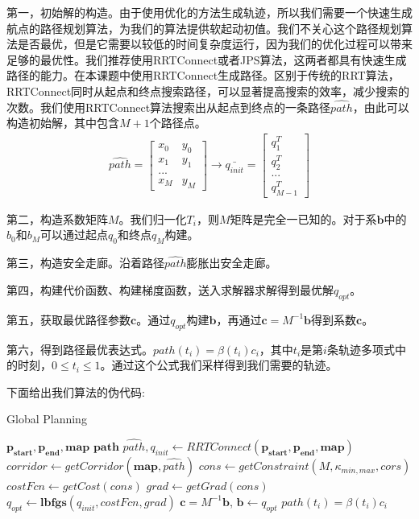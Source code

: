 \documentclass[master,academic]{ysuthesis} %
\begin{document}
		第一，初始解的构造。由于使用优化的方法生成轨迹，所以我们需要一个快速生成航点的路径规划算法，为我们的算法提供软起动初值。我们不关心这个路径规划算法是否最优，但是它需要以较低的时间复杂度运行，因为我们的优化过程可以带来足够的最优性。我们推荐使用RRTConnect或者JPS算法，这两者都具有快速生成路径的能力。在本课题中使用RRTConnect生成路径。区别于传统的RRT算法，RRTConnect同时从起点和终点搜索路径，可以显著提高搜索的效率，减少搜索的次数。我们使用RRTConnect算法搜索出从起点到终点的一条路径$\hat{path}$，由此可以构造初始解，其中包含$M+1$个路径点。
		\begin{equation}
			\begin{aligned}
				\hat{path} = \begin{bmatrix}
					x_0 &y_0\\
					x_1&y_1\\
					...\\
					x_M& y_M
				\end{bmatrix} \longrightarrow \bar{q_{init}}
				=\begin{bmatrix}
					q^T_1\\
					q^T_2\\
					...\\
					q^T_{M-1}
				\end{bmatrix}
			\end{aligned}
		\end{equation}

		第二，构造系数矩阵$M$。我们归一化$T_i$，则$M$矩阵是完全一已知的。对于系$\mathbf{b}$中的$b_0$和$b_M$可以通过起点$q_0$和终点$q_M$构建。
		
		第三，构造安全走廊。沿着路径$\hat{path}$膨胀出安全走廊。

		第四，构建代价函数、构建梯度函数，送入求解器求解得到最优解$q_{opt}$。

		第五，获取最优路径参数$\mathbf{c}$。通过$q_{opt}$构建$\mathbf{b}$，再通过$\mathbf{c} = M^{-1}\mathbf{b}$得到系数$\mathbf{c}$。

		第六，得到路径最优表达式。$path(t_i)=\beta(t_i)c_i$，其中$t_i$是第$i$条轨迹多项式中的时刻，$0 \le t_i \le 1$。通过这个公式我们采样得到我们需要的轨迹。
		
		下面给出我们算法的伪代码:
		 \begin{algorithm}[H]  
		 	\caption{Global Planning}  
		 	\label{alg:global_planning}  
		 	\begin{algorithmic}[1]  
		 		\REQUIRE  
		 		$\mathbf{p_{start}},\mathbf{p_{end}},\mathbf{map}$
		 		\ENSURE  
		 		$\mathbf{path}$
		 		\STATE $\hat{path},q_{init} \leftarrow RRTConnect(\mathbf{p_{start}},\mathbf{p_{end}},\mathbf{map})$
		 		\STATE $corridor \leftarrow getCorridor(\mathbf{map},\hat{path})$
		 		\STATE $cons \leftarrow getConstraint(M,\kappa_{min,max},cors)$
		 		\STATE $costFcn \leftarrow getCost(cons)$
		 		\STATE $grad \leftarrow getGrad(cons)$ \\
		 		\STATE $q_{opt} \leftarrow \mathbf{lbfgs}(q_{init},costFcn,grad)$
				\STATE $\mathbf{c} = M^{-1}\mathbf{b}$, $\mathbf{b} \longleftarrow q_{opt}$
				\RETURN $path(t_i)=\beta(t_i)c_i$
		 	\end{algorithmic}  
		 \end{algorithm}
		
\end{document}
